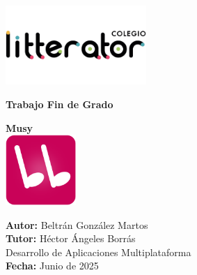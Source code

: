 \documentclass[11pt, a4paper]{article}
\begin{document}
\begin{titlepage}
    \centering

    \includegraphics[width=0.4\textwidth]{media/logo-litterator.png}

    \fontsize{26pt}{24pt}\selectfont \textbf{Trabajo Fin de Grado} \\
    \vspace{4.5cm}
    
    \fontsize{24pt}{24pt}\selectfont \textbf{Musy} \\
    \vspace{0.5cm}
    \includegraphics[width=0.2\textwidth]{media/Square310x310Logo.png} \\
    \vspace{2cm}

    \hfill
    \begin{minipage}{0.8\textwidth}
        \raggedleft
        \large
        \begin{spacing}{1.5}
            \textbf{Autor:} Beltrán González Martos \\
            \textbf{Tutor:} Héctor Ángeles Borrás \\
            Desarrollo de Aplicaciones Multiplataforma \\
            \textbf{Fecha:} Junio de 2025
        \end{spacing}
    \end{minipage}

    


\end{titlepage}
\end{document}
